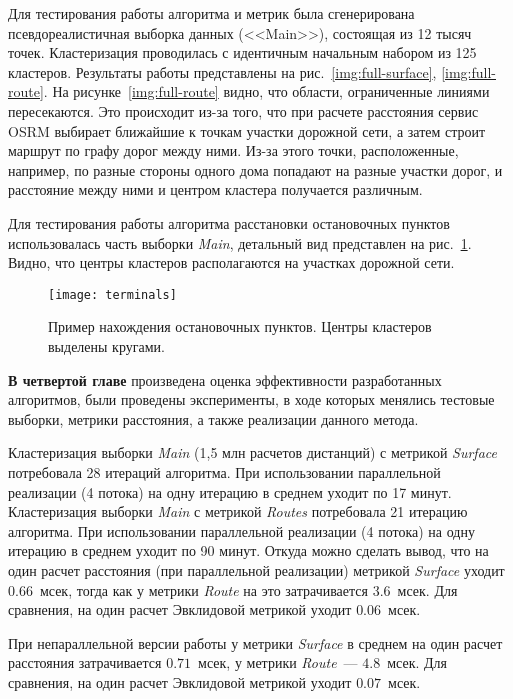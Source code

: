 Для тестирования работы алгоритма и метрик была сгенерирована псевдореалистичная выборка данных (<<Main>>), состоящая из 12 тысяч точек. Кластеризация проводилась с идентичным начальным набором из 125 кластеров. Результаты работы представлены на рис.~\ref{img:full-surface}, \ref{img:full-route}. На рисунке~\ref{img:full-route} видно, что области, ограниченные линиями пересекаются. Это происходит из-за того, что при расчете расстояния сервис OSRM выбирает ближайшие к точкам участки дорожной сети, а затем строит маршрут по графу дорог между ними. Из-за этого точки, расположенные, например, по разные стороны одного дома попадают на разные участки дорог, и расстояние между ними и центром кластера получается различным.

Для тестирования работы алгоритма расстановки остановочных пунктов использовалась часть выборки \emph{Main}, детальный вид представлен на рис.~\ref{img:terminals}. Видно, что центры кластеров располагаются на участках дорожной сети.
\begin{figure}[h!]
    \centering
    \texttt{[image: terminals]}\\[1ex]
    \parbox{.9\textwidth}{\caption{Пример нахождения остановочных пунктов. Центры кластеров выделены кругами.} \label{img:terminals}}
\end{figure}

\textbf{В четвертой главе} произведена оценка эффективности разработанных алгоритмов, были проведены эксперименты, в ходе которых менялись тестовые выборки, метрики расстояния, а также реализации данного метода.

Кластеризация выборки \emph{Main} (1,5 млн расчетов дистанций) с метрикой \emph{Surface} потребовала 28 итераций алгоритма. При использовании параллельной реализации (4 потока) на одну итерацию в среднем уходит по 17 минут. Кластеризация выборки \emph{Main} с метрикой \emph{Routes} потребовала 21 итерацию алгоритма. При использовании параллельной реализации (4 потока) на одну итерацию в среднем уходит по 90 минут. Откуда можно сделать вывод, что на один расчет расстояния (при параллельной реализации) метрикой \emph{Surface} уходит \( 0.66 \)~мсек, тогда как у метрики \emph{Route} на это затрачивается \( 3.6 \)~мсек. Для сравнения, на один расчет Эвклидовой метрикой уходит \( 0.06 \)~мсек.

При непараллельной версии работы у метрики \emph{Surface} в среднем на один расчет расстояния затрачивается \( 0.71 \)~мсек, у метрики \emph{Route}~--- \( 4.8 \)~мсек. Для сравнения, на один расчет Эвклидовой метрикой уходит \( 0.07 \)~мсек.

